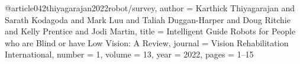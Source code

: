 @article{042thiyagarajan2022robot/survey,
author = {Karthick Thiyagarajan and Sarath Kodagoda and Mark Luu and Taliah Duggan-Harper and Doug Ritchie and Kelly Prentice and Jodi Martin},
title = {Intelligent Guide Robots for People who are Blind or have Low Vision: A Review},
journal = {Vision Rehabilitation International},
number = {1},
volume = {13},
year = {2022},
pages = {1--15}
}